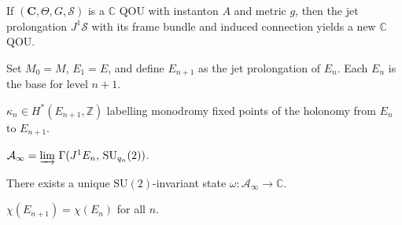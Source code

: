 \begin{proposition}
  \label{prop:jet-prolongation}
  If $(\mathbf{C}, \varTheta, G, \mathcal{S})$ is a $\mathbb{C}$ QOU with instanton $A$
  and metric $g$, then the jet prolongation $J^1 \mathcal{S}$ with its
  frame bundle and induced connection yields a new $\mathbb{C}$ QOU.
\end{proposition}

\begin{definition}
  \label{def:recursive-brane-tower}
  Set $M_0 = M$, $E_1 = E$, and define $E_{n+1}$ as the jet
  prolongation of $E_n$.  Each $E_n$ is the base for level $n+1$.
\end{definition}

\begin{definition}
  \label{def:quantum-characteristic-classes}
  $\kappa_n \in H^*(E_{n+1}, \mathbb{Z})$ labelling monodromy
  fixed points of the holonomy from $E_n$ to $E_{n+1}$.
\end{definition}

\begin{definition}
  \label{def:direct-limit-algebra}
  $\mathcal{A}_\infty = \varinjlim\,\Gamma(J^1 E_n,\,\mathrm{SU}_{q_n}(2))$.
\end{definition}

\begin{proposition}
  \label{prop:vacuum-state}
  There exists a unique $\mathrm{SU}(2)$-invariant state
  $\omega : \mathcal{A}_\infty \to \mathbb{C}$.
\end{proposition}

\begin{proposition}
  \label{prop:euler-char-stability}
  $\chi(E_{n+1}) = \chi(E_n)$ for all $n$.
\end{proposition}

